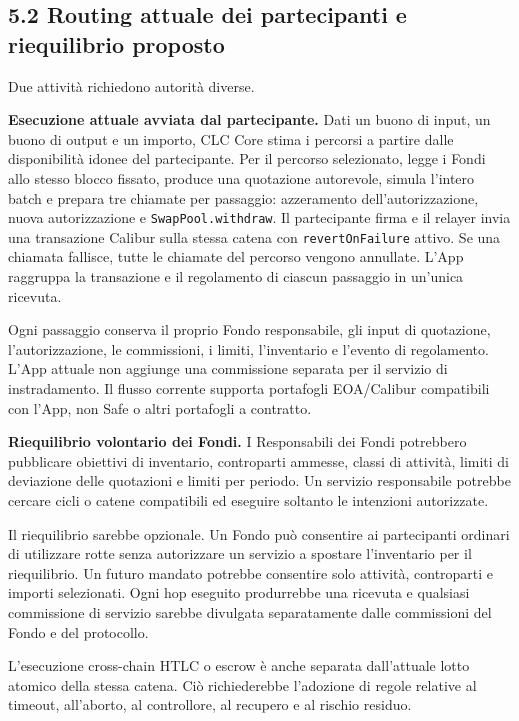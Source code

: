 \documentclass[11pt]{article}
\begin{document}
\subsection*{5.2 Routing attuale dei partecipanti e riequilibrio proposto}

Due attività richiedono autorità diverse.

\textbf{Esecuzione attuale avviata dal partecipante.} Dati un buono di input, un buono di output e un importo, CLC Core stima i percorsi a partire dalle disponibilità idonee del partecipante. Per il percorso selezionato, legge i Fondi allo stesso blocco fissato, produce una quotazione autorevole, simula l'intero batch e prepara tre chiamate per passaggio: azzeramento dell'autorizzazione, nuova autorizzazione e \texttt{SwapPool.withdraw}. Il partecipante firma e il relayer invia una transazione Calibur sulla stessa catena con \texttt{revertOnFailure} attivo. Se una chiamata fallisce, tutte le chiamate del percorso vengono annullate. L'App raggruppa la transazione e il regolamento di ciascun passaggio in un'unica ricevuta.

Ogni passaggio conserva il proprio Fondo responsabile, gli input di quotazione, l'autorizzazione, le commissioni, i limiti, l'inventario e l'evento di regolamento. L'App attuale non aggiunge una commissione separata per il servizio di instradamento. Il flusso corrente supporta portafogli EOA/Calibur compatibili con l'App, non Safe o altri portafogli a contratto.

\textbf{Riequilibrio volontario dei Fondi.} I Responsabili dei Fondi potrebbero pubblicare obiettivi di inventario, controparti ammesse, classi di attività, limiti di deviazione delle quotazioni e limiti per periodo. Un servizio responsabile potrebbe cercare cicli o catene compatibili ed eseguire soltanto le intenzioni autorizzate.

Il riequilibrio sarebbe opzionale. Un Fondo può consentire ai partecipanti ordinari di utilizzare rotte senza autorizzare un servizio a spostare l'inventario per il riequilibrio. Un futuro mandato potrebbe consentire solo attività, controparti e importi selezionati. Ogni hop eseguito produrrebbe una ricevuta e qualsiasi commissione di servizio sarebbe divulgata separatamente dalle commissioni del Fondo e del protocollo.

L'esecuzione cross-chain HTLC o escrow è anche separata dall'attuale lotto atomico della stessa catena. Ciò richiederebbe l'adozione di regole relative al timeout, all'aborto, al controllore, al recupero e al rischio residuo.
\end{document}
